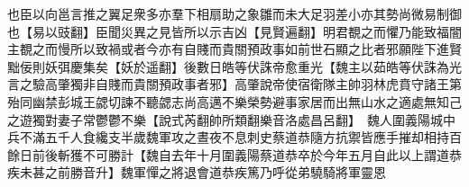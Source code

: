 也臣以向邕言推之翼足衆多亦羣下相扇助之象雛而未大足羽差小亦其勢尚微易制御也【易以豉翻】臣聞災異之見皆所以示吉凶【見賢遍翻】明君覩之而懼乃能致福闇主覩之而慢所以致禍或者今亦有自賤而貴關預政事如前世石顯之比者邪願陛下進賢黜佞則妖弭慶集矣【妖於遥翻】後數日皓等伏誅帝愈重光【魏主以茹皓等伏誅為光言之驗高肇獨非自賤而貴關預政事者邪】高肇說帝使宿衛隊主帥羽林虎賁守諸王第殆同幽禁彭城王勰切諫不聽勰志尚高邁不樂榮勢避事家居而出無山水之適處無知己之遊獨對妻子常鬱鬱不樂【說式芮翻帥所類翻樂音洛處昌呂翻】　魏人圍義陽城中兵不滿五千人食纔支半歲魏軍攻之晝夜不息刺史蔡道恭隨方抗禦皆應手摧却相持百餘日前後斬獲不可勝計【魏自去年十月圍義陽蔡道恭卒於今年五月自此以上謂道恭疾未甚之前勝音升】魏軍憚之將退會道恭疾篤乃呼從弟驍騎將軍靈恩